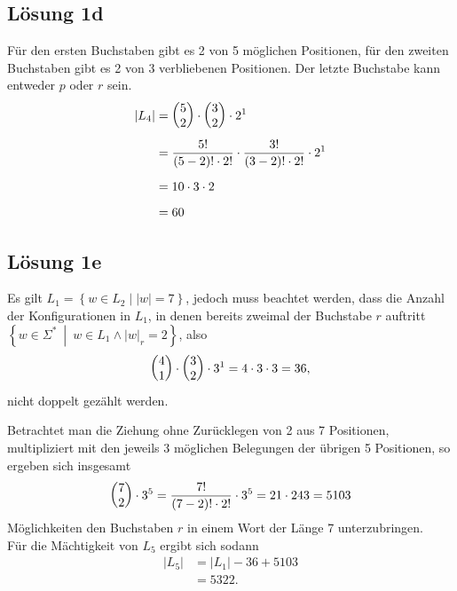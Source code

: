 \documentclass[main.tex]{subfiles}
\begin{document}
\subsection{Lösung 1d}
Für den ersten Buchstaben gibt es 2 von 5 möglichen Positionen, für den zweiten Buchstaben gibt es 2 von 3 verbliebenen Positionen.
Der letzte Buchstabe kann entweder $p$ oder $r$ sein.
\begin{align*}
    |L_4| &= \vektor{5\\ 2} \cdot \vektor{3\\ 2} \cdot 2^1 \\[1mm]
        &= \frac{5!}{(5-2)!\cdot 2!} \cdot \frac{3!}{(3-2)!\cdot 2!} \cdot 2^1 \\[2mm]
        &= 10 \cdot 3 \cdot 2 \\[2mm]
        &= 60
\end{align*}

\subsection{Lösung 1e}

Es gilt $L_1 = \left\{w \in L_2 \middle| |w|=7\right\}$, jedoch muss beachtet werden, dass die Anzahl der Konfigurationen in $L_1$,
in denen bereits zweimal der Buchstabe $r$ auftritt $\left\{ w\in \Sigma^*\ \middle|\ w\in L_1 \land |w|_r = 2 \right\}$, also 
$$
    \vektor{4\\1}\cdot \vektor{3\\2}\cdot 3^1 = 4\cdot 3\cdot 3 = 36,
$$
nicht doppelt gezählt werden.

Betrachtet man die Ziehung ohne Zurücklegen von 2 aus 7 Positionen, multipliziert mit den jeweils 3 möglichen Belegungen der übrigen 5 Positionen, so ergeben sich
insgesamt
$$
    \vektor{7\\ 2} \cdot 3^5 = \frac{7!}{(7-2)!\cdot 2!} \cdot 3^5 = 21 \cdot 243 = 5103
$$
Möglichkeiten den Buchstaben $r$ in einem Wort der Länge 7 unterzubringen.\\

Für die Mächtigkeit von $L_5$ ergibt sich sodann
\begin{align*}
    |L_5| &= |L_1| - 36 + 5103 \\[1mm]
          &= 5322.
\end{align*}
\end{document}
